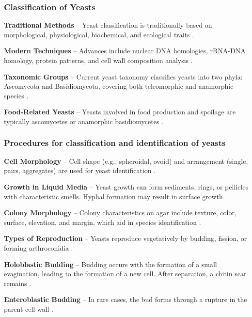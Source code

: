 \subsubsection{Classification of Yeasts}

\textbf{Traditional Methods} – Yeast classification is traditionally based on morphological, physiological, biochemical, and ecological traits \cite{L2-YeastClass}.

\textbf{Modern Techniques} – Advances include nuclear DNA homologies, rRNA-DNA homology, protein patterns, and cell wall composition analysis \cite{L2-YeastClass}.

\textbf{Taxonomic Groups} – Current yeast taxonomy classifies yeasts into two phyla: Ascomycota and Basidiomycota, covering both teleomorphic and anamorphic species \cite{L2-YeastClass}.

\textbf{Food-Related Yeasts} – Yeasts involved in food production and spoilage are typically ascomycetes or anamorphic basidiomycetes \cite{L2-YeastClass}.

\subsubsection{Procedures for classification and identification of yeasts}
\textbf{Cell Morphology} – Cell shape (e.g., spheroidal, ovoid) and arrangement (single, pairs, aggregates) are used for yeast identification \cite{L2-YeastClass}.

\textbf{Growth in Liquid Media} – Yeast growth can form sediments, rings, or pellicles with characteristic smells. Hyphal formation may result in surface growth \cite{L2-YeastClass}.

\textbf{Colony Morphology} – Colony characteristics on agar include texture, color, surface, elevation, and margin, which aid in species identification \cite{L2-YeastClass}.


\textbf{Types of Reproduction} – Yeasts reproduce vegetatively by budding, fission, or forming arthroconidia \cite{L2-YeastClass}.

\textbf{Holoblastic Budding} – Budding occurs with the formation of a small evagination, leading to the formation of a new cell. After separation, a chitin scar remains \cite{L2-YeastClass}.

\textbf{Enteroblastic Budding} – In rare cases, the bud forms through a rupture in the parent cell wall \cite{L2-YeastClass}.

